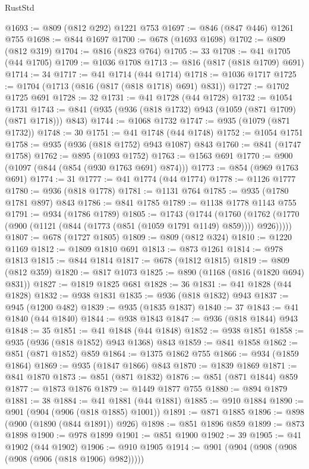\begin{lexlean}{RustStd}
\begin{coremodule}
@1693 := @809 (@812 @292) @1221 @753
@1697 := @846 (@847 @446) @1261 @755
@1698 := @844 @1697
@1700 := @678 (@1693 @1698)
@1702 := @809 (@812 @319)
@1704 := @816 (@823 @764)
@1705 := 33
@1708 := @41 @1705 (@44 @1705)
@1709 := @1036 @1708
@1713 := @816 (@817 (@818 @1709) @691)
@1714 := 34
@1717 := @41 @1714 (@44 @1714)
@1718 := @1036 @1717
@1725 := @1704 (@1713 (@816 (@817 (@818 @1718) @691) @831))
@1727 := @1702 @1725 @691
@1728 := 32
@1731 := @41 @1728 (@44 @1728)
@1732 := @1054 @1731
@1743 := @841 (@935 (@936 (@818 @1732) @943 (@1059 (@871 @1709) (@871 @1718))) @843)
@1744 := @1068 @1732
@1747 := @935 (@1079 (@871 @1732))
@1748 := 30
@1751 := @41 @1748 (@44 @1748)
@1752 := @1054 @1751
@1758 := @935 (@936 (@818 @1752) @943 @1087) @843
@1760 := @841 (@1747 @1758)
@1762 := @895 (@1093 @1752)
@1763 := @1563 @691
@1770 := @900 (@1097 (@844 (@854 (@930 @1763 @691) @874)))
@1773 := @854 (@969 @1763 @691)
@1774 := 31
@1777 := @41 @1774 (@44 @1774)
@1778 := @1126 @1777
@1780 := @936 (@818 @1778)
@1781 := @1131 @764
@1785 := @935 (@1780 @1781 @897) @843
@1786 := @841 @1785
@1789 := @1138 @1778 @1143 @755
@1791 := @934 (@1786 @1789)
@1805 := @1743
    (@1744
      (@1760 (@1762 (@1770 (@900 (@1121 (@844 (@1773 (@851 (@1059 @1791 @1149) @859)))) @926)))))
@1807 := @678 (@1727 @1805)
@1809 := @809 (@812 @324)
@1810 := @1220 @1169
@1812 := @1809 @1810 @691
@1813 := @873 @1261
@1814 := @978 @1813
@1815 := @844 @1814
@1817 := @678 (@1812 @1815)
@1819 := @809 (@812 @359)
@1820 := @817 @1073
@1825 := @890 (@1168 (@816 (@1820 @694) @831))
@1827 := @1819 @1825 @681
@1828 := 36
@1831 := @41 @1828 (@44 @1828)
@1832 := @938 @1831
@1835 := @936 (@818 @1832) @943
@1837 := @945 (@1200 @482)
@1839 := @935 (@1835 @1837)
@1840 := 37
@1843 := @41 @1840 (@44 @1840)
@1844 := @938 @1843
@1847 := @936 (@818 @1844) @943
@1848 := 35
@1851 := @41 @1848 (@44 @1848)
@1852 := @938 @1851
@1858 := @935 (@936 (@818 @1852) @943 @1368) @843
@1859 := @841 @1858
@1862 := @851 (@871 @1852) @859
@1864 := @1375 @1862 @755
@1866 := @934 (@1859 @1864)
@1869 := @935 (@1847 @1866) @843
@1870 := @1839 @1869
@1871 := @841 @1870
@1873 := @851 (@871 @1832)
@1876 := @851 (@871 @1844) @859
@1877 := @1873 @1876
@1879 := @1449 @1877 @755
@1880 := @894 @1879
@1881 := 38
@1884 := @41 @1881 (@44 @1881)
@1885 := @910 @1884
@1890 := @901 (@904 (@906 (@818 @1885) @1001))
@1891 := @871 @1885
@1896 := @898 (@900 (@1890 (@844 @1891)) @926)
@1898 := @851 @1896 @859
@1899 := @873 @1898
@1900 := @978 @1899
@1901 := @851 @1900
@1902 := 39
@1905 := @41 @1902 (@44 @1902)
@1906 := @910 @1905
@1914 := @901 (@904 (@908 (@908 (@908 (@906 (@818 @1906) @982)))))

\end{coremodule}
\end{lexlean}
